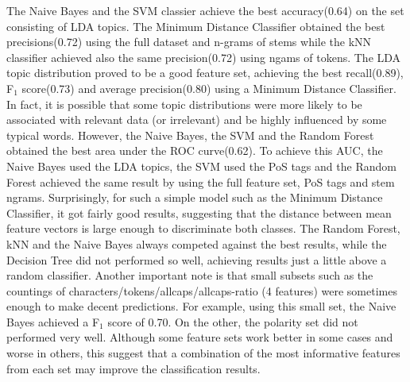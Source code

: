 

The Naive Bayes and the SVM classier achieve the best accuracy(0.64) on the set consisting of LDA topics. The Minimum Distance Classifier obtained the best precisions(0.72) using the full dataset and n-grams of stems while the kNN classifier achieved also the same precision(0.72) using ngams of tokens. The LDA topic distribution proved to be a good feature set, achieving the best recall(0.89), F$_1$ score(0.73) and average precision(0.80) using a Minimum Distance Classifier. In fact, it is possible that some topic distributions were more likely to be associated with relevant data (or irrelevant) and be highly influenced by some typical words. However, the Naive Bayes, the SVM and the Random Forest obtained the best area under the ROC curve(0.62). To achieve this AUC, the Naive Bayes used the LDA topics, the SVM used the PoS tags and the Random Forest achieved the same result by using the full feature set, PoS tags and stem ngrams. 
Surprisingly, for such a simple model such as the Minimum Distance Classifier, it got fairly good results, suggesting that the distance between mean feature vectors is large enough to discriminate both classes. The Random Forest, kNN and the Naive Bayes always competed against the best results, while the Decision Tree did not performed so well, achieving results just a little above a random classifier. Another important note is that small subsets such as the countings of characters/tokens/allcaps/allcaps-ratio (4 features) were sometimes enough to make decent predictions. For example, using this small set, the Naive Bayes achieved a F$_1$ score of 0.70. On the other, the polarity set did not performed very well.  Although some feature sets work better in some cases and worse in others, this suggest that a combination of the most informative features from each set may improve the classification results. 

